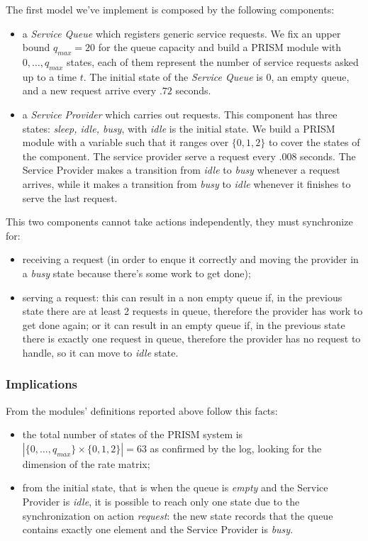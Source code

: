 The first model we've implement is composed by the following
components:
\begin{itemize}
\item a \emph{Service Queue} which registers generic service
  requests. We fix an upper bound $q_{max} = 20$ for the queue
  capacity and build a PRISM module with $0,\ldots,q_{max}$ states,
  each of them represent the number of service requests asked up to a
  time $t$. The initial state of the \emph{Service Queue} is $0$, an
  empty queue, and a new request arrive every $.72$ seconds.
\item a \emph{Service Provider} which carries out requests. This
  component has three states: \emph{sleep, idle, busy}, with
  \emph{idle} is the initial state. We build a PRISM module with a
  variable such that it ranges over $\{0,1,2\}$ to cover the states of
  the component. The service provider serve a request every $.008$
  seconds. The Service Provider makes a transition from \emph{idle} to
  \emph{busy} whenever a request arrives, while it makes a transition
  from \emph{busy} to \emph{idle} whenever it finishes to serve the
  last request.
\end{itemize}
This two components cannot take actions independently, they must
synchronize for:
\begin{itemize}
\item receiving a request (in order to enque it correctly and moving
  the provider in a \emph{busy} state because there's some work to get
  done);
\item serving a request: this can result in a non empty queue if, in
  the previous state there are at least 2 requests in queue, therefore
  the provider has work to get done again; or it can result in an
  empty queue if, in the previous state there is exactly one request
  in queue, therefore the provider has no request to handle, so it can
  move to \emph{idle} state.
\end{itemize}

\subsubsection{Implications}

From the modules' definitions reported above follow this facts:
\begin{itemize}
\item the total number of states of the PRISM system is
  $|\{0,\ldots,q_{max}\} \times \{0,1,2\}| = 63$ as confirmed by the
  log, looking for the dimension of the rate matrix;
\item from the initial state, that is when the queue is \emph{empty}
  and the Service Provider is \emph{idle}, it is possible to reach
  only one state due to the synchronization on action \emph{request}:
  the new state records that the queue contains exactly one element
  and the Service Provider is \emph{busy}.
\end{itemize}

